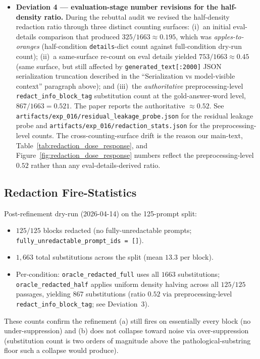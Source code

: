 \begin{itemize}[leftmargin=*,nosep]
\item \textbf{Deviation 4 --- evaluation-stage number revisions for the half-density ratio.} During the rebuttal audit we revised the half-density redaction ratio through three distinct counting surfaces: (i)~an initial eval-details comparison that produced $325/1663 \approx 0.195$, which was \emph{apples-to-oranges} (half-condition \texttt{details}-dict count against full-condition dry-run count); (ii)~a same-surface re-count on eval details yielded $753/1663 \approx 0.45$ (same surface, but still affected by \texttt{generated\_text[:2000]} JSON serialization truncation described in the ``Serialization vs model-visible context'' paragraph above); and (iii)~the \emph{authoritative} preprocessing-level \texttt{redact\_info\_block\_tag} substitution count at the gold-answer-word level, $867/1663 = 0.521$. The paper reports the authoritative $\approx 0.52$. See \texttt{artifacts/exp\_016/residual\_leakage\_probe.json} for the residual leakage probe and \texttt{artifacts/exp\_016/redaction\_stats.json} for the preprocessing-level counts. The cross-counting-surface drift is the reason our main-text, Table~\ref{tab:redaction_dose_response}, and Figure~\ref{fig:redaction_dose_response} numbers reflect the preprocessing-level $0.52$ rather than any eval-details-derived ratio.
\end{itemize}

\subsection{Redaction Fire-Statistics}
\label{app:redaction_stats}

Post-refinement dry-run (2026-04-14) on the 125-prompt split:
\begin{itemize}[leftmargin=*,nosep]
  \item $125/125$ blocks redacted (no fully-unredactable prompts; \texttt{fully\_unredactable\_prompt\_ids = []}).
  \item $1{,}663$ total substitutions across the split (mean $13.3$ per block).
  \item Per-condition: \texttt{oracle\_redacted\_full} uses all $1663$ substitutions; \texttt{oracle\_redacted\_half} applies uniform density halving across all $125/125$ passages, yielding $867$ substitutions (ratio $0.52$ via preprocessing-level \texttt{redact\_info\_block\_tag}; see Deviation~3).
\end{itemize}
These counts confirm the refinement (a) still fires on essentially every block (no under-suppression) and (b) does not collapse toward noise via over-suppression (substitution count is two orders of magnitude above the pathological-substring floor such a collapse would produce).

